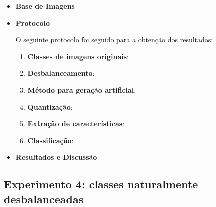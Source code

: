 \begin{itemize}
\item[] \textbf{Base de Imagens}


\item[] \textbf{Protocolo}

O seguinte protocolo foi seguido para a obtenção dos resultados:

\begin{enumerate}
\item \textbf{Classes de imagens originais}:
\item \textbf{Desbalanceamento}:
\item \textbf{Método para geração artificial}:
\item \textbf{Quantização}:
\item \textbf{Extração de características}:
\item \textbf{Classificação}:
\end{enumerate}
\item[] \textbf{Resultados e Discussão}

\end{itemize}

\subsection{Experimento 4: classes naturalmente desbalanceadas}

